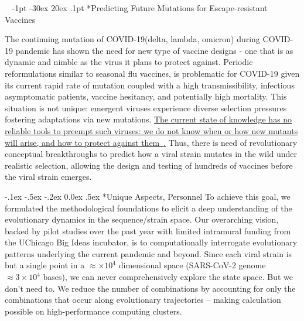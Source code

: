 \documentclass[onecolumn, compsoc,12pt]{IEEEtran}
\makeatletter
\renewcommand\section{\@startsection {section}{1}{\z@}%
                                   {-1pt \@plus -30ex \@minus 20ex}%
                                   {.1pt}%
                                   {\large\bfseries\scshape}}
\renewcommand\paragraph{\@startsection {section}{1}{\z@}%
                                   {-.1ex \@plus -.5ex \@minus -.2ex}%
                                   {0.0ex \@plus.5ex}%
                                   {\fontsize{11}{10}\selectfont\bfseries\itshape\sffamily\color{black}}}
\def\hcov{SARS-CoV-2\xspace}
\def\cov{COVID-19\xspace}
\makeatother
\begin{document}
 

\vspace{20pt}



\clearpage
\setcounter{page}{1}


$\phantom{x}$
\vspace{-35pt}  
\section*{Predicting Future Mutations for  Escape-resistant Vaccines}


The continuing mutation of \cov (delta, lambda, omicron) during \cov pandemic  has shown the need for new type of vaccine designs - one that is as dynamic and nimble as the virus it plans to protect against. Periodic reformulations similar to  seasonal  flu vaccines,  is  problematic for \cov given its current rapid rate of mutation coupled with a high transmissibility, infectious asymptomatic patients, vaccine hesitancy, and potentially high mortality. This situation is not unique: emergent viruses experience diverse  selection pressures fostering  adaptations via new mutations. \uline{The current state of knowledge has no reliable tools to preempt such viruses: we do not know when or how new mutants will arise, and how to protect against them~\cite{gou2020systematic,hannenhalli1995transforming,jean2007genome,ozery2003two,tesler2002efficient,shao2012approximating,fair2019viral}.} 
Thus, there is need of revolutionary conceptual  breakthroughs to predict how a viral strain  mutates in the wild under realistic selection, allowing  the design and testing of hundreds of vaccines before the viral strain emerges.

\paragraph*{Unique Aspects, Personnel} To achieve this goal, we formulated the methodological foundations to elicit a deep understanding of the evolutionary dynamics  in  the sequence/strain space. Our overarching vision, backed by pilot studies over the past year with limited intramural  funding from the UChicago Big Ideas  incubator, is to  computationally interrogate  evolutionary patterns underlying  the current  pandemic and beyond. Since each viral strain is but a single point in a  $\approx  \times10^4$ dimensional space (\hcov genome  $\approx 3 \times 10^4$ bases), we can never comprehensively explore the  state space. But we don't need to. We reduce the number of combinations by accounting for only the combinations that occur along evolutionary trajectories – making calculation possible on high-performance computing clusters.
\end{document}
